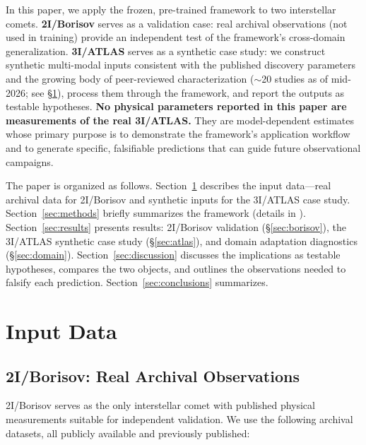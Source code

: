 \documentclass[usenatbib]{mnras}
\begin{document}
In this paper, we apply the frozen, pre-trained framework to two interstellar comets. \textbf{2I/Borisov} serves as a validation case: real archival observations (not used in training) provide an independent test of the framework's cross-domain generalization. \textbf{3I/ATLAS} serves as a synthetic case study: we construct synthetic multi-modal inputs consistent with the published discovery parameters and the growing body of peer-reviewed characterization ($\sim$20 studies as of mid-2026; see \S\ref{sec:data}), process them through the framework, and report the outputs as testable hypotheses. \textbf{No physical parameters reported in this paper are measurements of the real 3I/ATLAS.} They are model-dependent estimates whose primary purpose is to demonstrate the framework's application workflow and to generate specific, falsifiable predictions that can guide future observational campaigns.

The paper is organized as follows. Section~\ref{sec:data} describes the input data---real archival data for 2I/Borisov and synthetic inputs for the 3I/ATLAS case study. Section~\ref{sec:methods} briefly summarizes the framework (details in \citealt{paperI}). Section~\ref{sec:results} presents results: 2I/Borisov validation (\S\ref{sec:borisov}), the 3I/ATLAS synthetic case study (\S\ref{sec:atlas}), and domain adaptation diagnostics (\S\ref{sec:domain}). Section~\ref{sec:discussion} discusses the implications as testable hypotheses, compares the two objects, and outlines the observations needed to falsify each prediction. Section~\ref{sec:conclusions} summarizes.

\section{Input Data}\label{sec:data}

\subsection{2I/Borisov: Real Archival Observations}

2I/Borisov serves as the only interstellar comet with published physical measurements suitable for independent validation. We use the following archival datasets, all publicly available and previously published:
\end{document}
